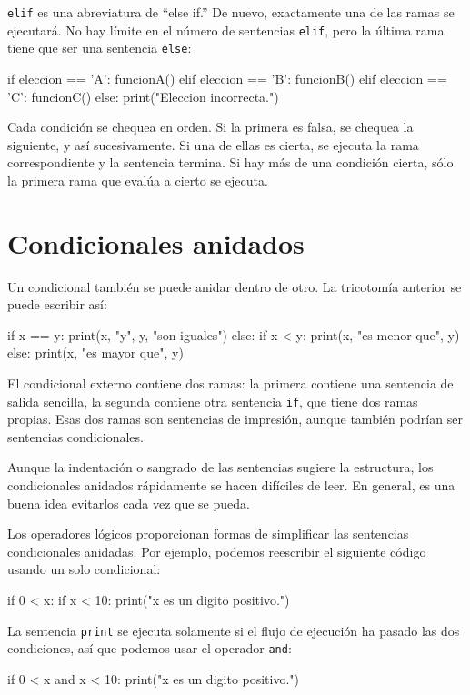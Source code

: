 \texttt{elif} es una abreviatura de ``else if.'' De nuevo, exactamente
una de las ramas se ejecutará. No hay límite en el número de sentencias
\texttt{elif}, pero la última rama tiene que ser una sentencia \texttt{else}:
\begin{pythoncode}
if eleccion == 'A':
  funcionA()
elif eleccion == 'B':
  funcionB()
elif eleccion == 'C':
  funcionC()
else:
  print("Eleccion incorrecta.")
\end{pythoncode}

Cada condición se chequea en orden. Si la primera es falsa, se chequea
la siguiente, y así sucesivamente. Si una de ellas es cierta, se ejecuta
la rama correspondiente y la sentencia termina. Si hay más de una
condición cierta, sólo la primera rama que evalúa a cierto se ejecuta.

\section{Condicionales anidados}

Un condicional también se puede anidar dentro de otro. La tricotomía
anterior se puede escribir así:

\begin{pythoncode}
if x == y:
  print(x, "y", y, "son iguales")
else:
  if x < y:
    print(x, "es menor que", y)
  else:
    print(x, "es mayor que", y)
\end{pythoncode}
 El condicional externo contiene dos ramas: la primera contiene una
sentencia de salida sencilla, la segunda contiene otra sentencia \texttt{if},
que tiene dos ramas propias. Esas dos ramas son sentencias de impresión,
aunque también podrían ser sentencias condicionales.

Aunque la indentación o sangrado de las sentencias sugiere la estructura,
los condicionales anidados rápidamente se hacen difíciles de leer.
En general, es una buena idea evitarlos cada vez que se pueda.

Los operadores lógicos proporcionan formas de simplificar las sentencias
condicionales anidadas. Por ejemplo, podemos reescribir el siguiente
código usando un solo condicional:
\begin{pythoncode}
if 0 < x:
  if x < 10:
    print("x es un digito positivo.")
\end{pythoncode}

La sentencia \texttt{print} se ejecuta solamente si el flujo de ejecución
ha pasado las dos condiciones, así que podemos usar el operador \texttt{and}:
\begin{pythoncode}
if 0 < x and x < 10:
  print("x es un digito positivo.")
\end{pythoncode}

